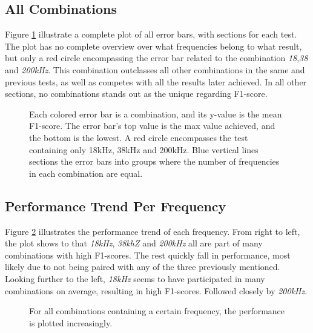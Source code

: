     \subsection{All Combinations}
        Figure \ref{errorbar_fig} illustrate a complete plot of all error bars, with sections for each test. The plot has no complete overview over what frequencies belong to what result, but only a red circle encompassing the error bar related to the combination \textit{18},\textit{38} and \textit{200kHz}. This combination outclasses all other combinations in the same and previous tests, as well as competes with all the results later achieved. In all other sections, no combinations stands out as the unique regarding F1-score.
        
        \begin{figure}[H]
            \centering
            
            \caption[Error bars per combination]{Each colored error bar is a combination, and its y-value is the mean F1-score. The error bar's top value is the max value achieved, and the bottom is the lowest. A red circle encompasses the test containing only 18kHz, 38kHz and 200kHz. Blue vertical lines sections the error bars into groups where the number of frequencies in each combination are equal.}
          	\medskip 
            \label{errorbar_fig}
        \end{figure}
        
        
        
    \subsection{Performance Trend Per Frequency}
        Figure \ref{performance_trend_fig} illustrates the performance trend of each frequency. From right to left, the plot shows to that \textit{18kHz}, \textit{38khZ} and \textit{200kHz} all are part of many combinations with high F1-scores. The rest quickly fall in performance, most likely due to not being paired with any of the three previously mentioned. Looking further to the left, \textit{18kHz} seems to have participated in many combinations on average, resulting in high F1-scores. Followed closely by \textit{200kHz}.
        \begin{figure}[H]
            \centering
            
            \caption[Performance trend per frequency]{For all combinations containing a certain frequency, the performance is plotted increasingly.}
          	\medskip 
            \label{performance_trend_fig}
        \end{figure}
    

    
    
